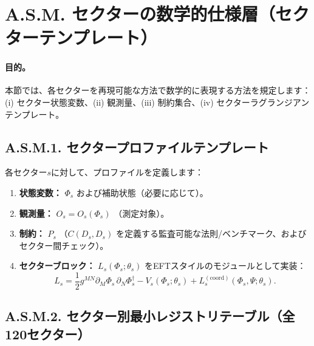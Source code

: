 \documentclass[13pt,a4paper]{ltjsarticle}
\begin{document}
	\section*{A.S.M. セクターの数学的仕様層（セクターテンプレート）}
	\label{sec:sector-math-layer}
	
	\paragraph{目的。}
	本節では、各セクターを再現可能な方法で数学的に表現する方法を規定します：(i) セクター状態変数、(ii) 観測量、(iii) 制約集合、(iv) セクターラグランジアンテンプレート。
	
	\subsection*{A.S.M.1. セクタープロファイルテンプレート}
	
	各セクター$s$に対して、プロファイルを定義します：
	\begin{enumerate}[leftmargin=*]
		\item \textbf{状態変数：} $\Phi_s$ および補助状態（必要に応じて）。
		\item \textbf{観測量：} $O_s=O_s(\Phi_s)$ （測定対象）。
		\item \textbf{制約：} $P_s$ （$C(D_s,D_s)$ を定義する監査可能な法則/ベンチマーク、およびセクター間チェック）。
		\item \textbf{セクターブロック：} $L_s(\Phi_s;\theta_s)$ をEFTスタイルのモジュールとして実装：
		$$
		L_s = \frac{1}{2}g^{MN}\partial_M\Phi_s\,\partial_N\Phi_s^\dagger - V_s(\Phi_s;\theta_s) + L^{(\mathrm{coord})}_s(\Phi_s,\Psi;\theta_s).
		$$
	\end{enumerate}
	
	\subsection*{A.S.M.2. セクター別最小レジストリテーブル（全120セクター）}
	
\end{document}
